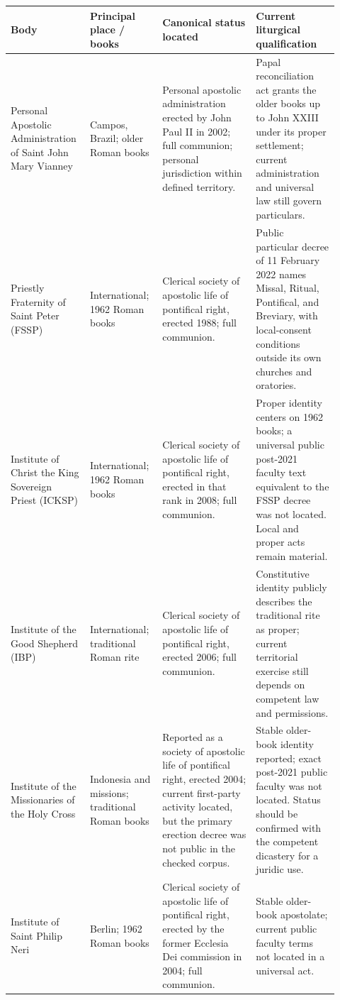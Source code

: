 \begin{longtable}{>{\bfseries\raggedright\arraybackslash}p{0.21\linewidth}>{\raggedright\arraybackslash}p{0.20\linewidth}>{\raggedright\arraybackslash}p{0.27\linewidth}>{\raggedright\arraybackslash}p{0.24\linewidth}}
\toprule
\textbf{Body} & \textbf{Principal place / books} & \textbf{Canonical status located} & \textbf{Current liturgical qualification}\\
\midrule
\endhead
Personal Apostolic Administration of Saint John Mary Vianney & Campos, Brazil; older Roman books & Personal apostolic administration erected by John Paul II in 2002; full communion; personal jurisdiction within defined territory. & Papal reconciliation act grants the older books up to John XXIII under its proper settlement; current administration and universal law still govern particulars.\\
Priestly Fraternity of Saint Peter (FSSP) & International; 1962 Roman books & Clerical society of apostolic life of pontifical right, erected 1988; full communion. & Public particular decree of 11 February 2022 names Missal, Ritual, Pontifical, and Breviary, with local-consent conditions outside its own churches and oratories.\\
Institute of Christ the King Sovereign Priest (ICKSP) & International; 1962 Roman books & Clerical society of apostolic life of pontifical right, erected in that rank in 2008; full communion. & Proper identity centers on 1962 books; a universal public post-2021 faculty text equivalent to the FSSP decree was not located. Local and proper acts remain material.\\
Institute of the Good Shepherd (IBP) & International; traditional Roman rite & Clerical society of apostolic life of pontifical right, erected 2006; full communion. & Constitutive identity publicly describes the traditional rite as proper; current territorial exercise still depends on competent law and permissions.\\
Institute of the Missionaries of the Holy Cross & Indonesia and missions; traditional Roman books & Reported as a society of apostolic life of pontifical right, erected 2004; current first-party activity located, but the primary erection decree was not public in the checked corpus. & Stable older-book identity reported; exact post-2021 public faculty was not located. Status should be confirmed with the competent dicastery for a juridic use.\\
Institute of Saint Philip Neri & Berlin; 1962 Roman books & Clerical society of apostolic life of pontifical right, erected by the former Ecclesia Dei commission in 2004; full communion. & Stable older-book apostolate; current public faculty terms not located in a universal act.\\

\end{longtable}
